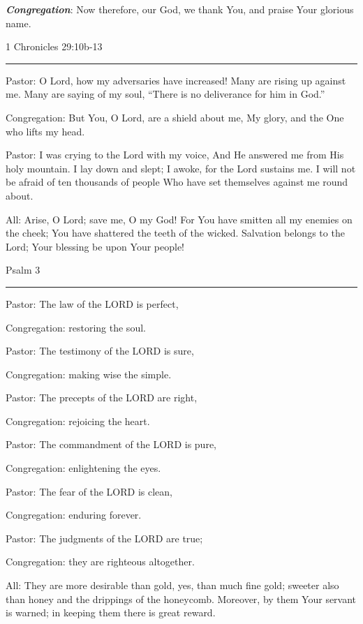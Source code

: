 \documentclass[]{book}
\begin{document}
\textbf{\emph{Congregation}}: Now therefore, our God, we thank You, and praise Your glorious name.

\textbar{} 1 Chronicles 29:10b-13 \textbar{}

\begin{center}\rule{0.5\linewidth}{\linethickness}\end{center}

Pastor: O Lord, how my adversaries have increased! Many are rising up against me. Many are saying of my soul, ``There is no deliverance for him in God.''

Congregation: But You, O Lord, are a shield about me, My glory, and the One who lifts my head.

Pastor: I was crying to the Lord with my voice, And He answered me from His holy mountain. I lay down and slept; I awoke, for the Lord sustains me. I will not be afraid of ten thousands of people Who have set themselves against me round about.

All: Arise, O Lord; save me, O my God! For You have smitten all my enemies on the cheek; You have shattered the teeth of the wicked. Salvation belongs to the Lord; Your blessing be upon Your people!

\textbar{} Psalm 3 \textbar{}

\begin{center}\rule{0.5\linewidth}{\linethickness}\end{center}

Pastor: The law of the LORD is perfect,

Congregation: restoring the soul.

Pastor: The testimony of the LORD is sure,

Congregation: making wise the simple.

Pastor: The precepts of the LORD are right,

Congregation: rejoicing the heart.

Pastor: The commandment of the LORD is pure,

Congregation: enlightening the eyes.

Pastor: The fear of the LORD is clean,

Congregation: enduring forever.

Pastor: The judgments of the LORD are true;

Congregation: they are righteous altogether.

All: They are more desirable than gold, yes, than much fine gold; sweeter also than honey and the drippings of the honeycomb. Moreover, by them Your servant is warned; in keeping them there is great reward.
\end{document}
